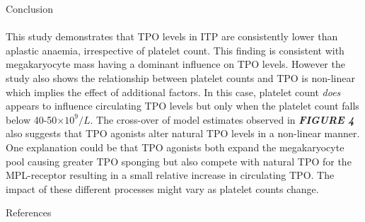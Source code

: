 \documentclass[landscape,a0paper,fontscale=0.285]{beamer} %
\newlength{\onecolwid}
\begin{document}
\begin{frame}[t]
\begin{columns}[t]
\begin{column}{\onecolwid}
\begin{block}{Conclusion}
\paragraph{} This study demonstrates that TPO levels in ITP are consistently lower than aplastic anaemia, irrespective of platelet count. This finding is consistent with megakaryocyte mass having a dominant influence on TPO levels. However the study also shows the relationship between platelet counts and TPO is non-linear which implies the effect of additional factors. In this case, platelet count \emph{does} appears to influence circulating TPO levels but only when the platelet count falls below 40-50$\times10^9/L$. The cross-over of model estimates observed in \textbf{\emph{FIGURE 4}} also suggests that TPO agonists alter natural TPO levels in a non-linear manner. One explanation could be that TPO agonists both expand the megakaryocyte pool causing greater TPO sponging but also compete with natural TPO for the MPL-receptor resulting in a small relative increase in circulating TPO. The impact of these different processes might vary as platelet counts change. 

\end{block}






\begin{block}{References}

\small{
\vspace{0.2in}}


\end{block}
\end{column}
\end{columns}
\end{frame}
\end{document}
